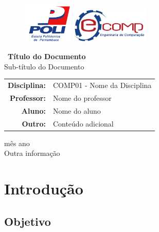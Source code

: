 \documentclass[12pt]{article}
\begin{document}
	\thispagestyle{empty}
	\begin{figure}[!htp]
	    {\includegraphics[scale=0.2, width=2.4cm]{../imagens/poli.png}}\hfill%
	    {\includegraphics[scale=0.3, width=3.7cm]{../imagens/ecomp.png}}%
  	\end{figure}
	\vspace{3.5cm}

	\begin{center}
		\Large{ \ {\bf Título do Documento}}\\[0.2cm]
		\large{Sub-título do Documento}
	\end{center}
	
	\vspace{5cm}
	\begin{center}
		\begin{tabular}{rl}
			{\bf Disciplina:} & {\sf COMP01 - Nome da Disciplina}\\
			{\bf Professor:} & {\sf Nome do professor}\\
			{\bf Aluno:} & {\sf Nome do aluno}\\
			{\bf Outro:} & {\sf Conteúdo adicional}\\
		\end{tabular}
	\end{center}
	\vspace{3.5cm}
	\begin{center}
		{\sc mês ano}\\{\sc Outra informação}\\
	\end{center}
	\newpage

	\tableofcontents
	
	\newpage
	
	\section{Introdução}
	\subsection{Objetivo}
	
\end{document}
